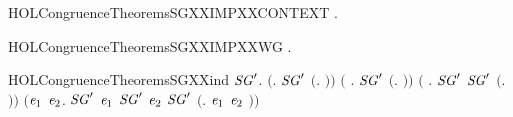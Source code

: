 \begin{SaveVerbatim}{HOLCongruenceTheoremsSGXXIMPXXCONTEXT}
\HOLTokenTurnstile{} \HOLSymConst{\HOLTokenForall{}}.   \HOLSymConst{\HOLTokenImp{}}  
\end{SaveVerbatim}
\newcommand{\HOLCongruenceTheoremsSGXXIMPXXCONTEXT}{\UseVerbatim{HOLCongruenceTheoremsSGXXIMPXXCONTEXT}}
\begin{SaveVerbatim}{HOLCongruenceTheoremsSGXXIMPXXWG}
\HOLTokenTurnstile{} \HOLSymConst{\HOLTokenForall{}}.   \HOLSymConst{\HOLTokenImp{}}  
\end{SaveVerbatim}
\newcommand{\HOLCongruenceTheoremsSGXXIMPXXWG}{\UseVerbatim{HOLCongruenceTheoremsSGXXIMPXXWG}}
\begin{SaveVerbatim}{HOLCongruenceTheoremsSGXXind}
\HOLTokenTurnstile{} \HOLSymConst{\HOLTokenForall{}}\ensuremath{\HOLBoundVar{SG}\sp{\prime}}.
       \ensuremath{(}\HOLSymConst{\HOLTokenForall{}}. \ensuremath{\HOLBoundVar{SG}\sp{\prime}} \ensuremath{(}\HOLTokenLambda{}. \ensuremath{)}\ensuremath{)} \HOLSymConst{\HOLTokenConj{}}
       \ensuremath{(}\HOLSymConst{\HOLTokenForall{}} .   \HOLSymConst{\HOLTokenImp{}} \ensuremath{\HOLBoundVar{SG}\sp{\prime}} \ensuremath{(}\HOLTokenLambda{}.  \HOLSymConst{\ensuremath{\ldotp}} \ensuremath{)}\ensuremath{)} \HOLSymConst{\HOLTokenConj{}}
       \ensuremath{(}\HOLSymConst{\HOLTokenForall{}} . \ensuremath{\HOLBoundVar{SG}\sp{\prime}}  \HOLSymConst{\HOLTokenImp{}} \ensuremath{\HOLBoundVar{SG}\sp{\prime}} \ensuremath{(}\HOLTokenLambda{}. \HOLSymConst{\ensuremath{\ldotp}} \ensuremath{)}\ensuremath{)} \HOLSymConst{\HOLTokenConj{}}
       \ensuremath{(}\HOLSymConst{\HOLTokenForall{}}\ensuremath{\HOLBoundVar{e}\sb{\mathrm{1}}} \ensuremath{\HOLBoundVar{e}\sb{\mathrm{2}}}. \ensuremath{\HOLBoundVar{SG}\sp{\prime}} \ensuremath{\HOLBoundVar{e}\sb{\mathrm{1}}} \HOLSymConst{\HOLTokenConj{}} \ensuremath{\HOLBoundVar{SG}\sp{\prime}} \ensuremath{\HOLBoundVar{e}\sb{\mathrm{2}}} \HOLSymConst{\HOLTokenImp{}} \ensuremath{\HOLBoundVar{SG}\sp{\prime}} \ensuremath{(}\HOLTokenLambda{}. \ensuremath{\HOLBoundVar{e}\sb{\mathrm{1}}}  \HOLSymConst{\ensuremath{+}} \ensuremath{\HOLBoundVar{e}\sb{\mathrm{2}}} \ensuremath{)}\ensuremath{)} \HOLSymConst{\HOLTokenConj{}}

\end{SaveVerbatim}
